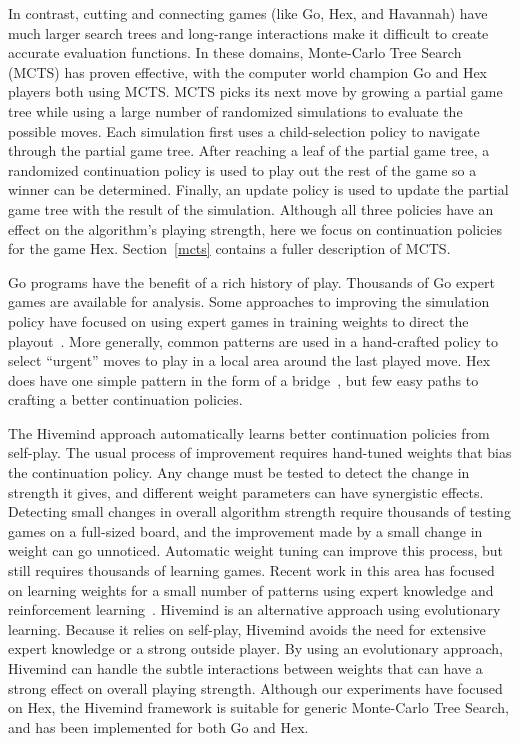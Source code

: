 \documentclass{acm_proc_article-sp}
\begin{document}
In contrast, cutting and connecting games (like Go, Hex, and Havannah)
have much larger search trees and long-range interactions make it difficult to create accurate evaluation functions.
In these domains, Monte-Carlo Tree Search (MCTS) has proven effective, 
with the computer world champion Go and Hex players both using MCTS.
MCTS picks its next move by growing a partial game tree while using
a large number of randomized simulations to evaluate the possible moves.
Each simulation first uses a child-selection policy to navigate through the partial game tree.
After reaching a leaf of the partial game tree, a randomized continuation policy is used to play out the rest of the game 
so a winner can be determined.
Finally, an update policy is used to update the partial game tree with the result of the simulation.
Although all three policies have an effect on the algorithm's playing strength, here we focus on
continuation policies for the game Hex.
Section~\ref{mcts} contains a fuller description of MCTS.

Go programs have the benefit of a rich history of play. Thousands of Go expert games are available for analysis. Some approaches to improving the simulation policy have focused on using expert games in training weights to direct the playout~\cite{chaslot2010adding}. More generally, common patterns are used in a hand-crafted policy to select ``urgent'' moves to play in a local area around the last played move. Hex does have one simple pattern in the form of a bridge~\cite{anshelevich2002hierarchical}, but few easy paths to crafting a better continuation policies.

The Hivemind approach automatically learns better continuation policies from self-play. 
The usual process of improvement requires hand-tuned weights that bias the continuation policy. 
Any change must be tested to detect the change in strength it gives,
and different weight parameters can have synergistic effects.
Detecting small changes in overall algorithm strength require thousands of testing games on a full-sized board, and
the improvement made by a small change in weight can go unnoticed.
Automatic weight tuning can improve this process, but still requires thousands of learning games. 
Recent work in this area has focused on learning weights for a small number of patterns using expert knowledge and reinforcement learning~\cite{silver2009monte}. 
Hivemind is an alternative approach using evolutionary learning.
Because it relies on self-play, Hivemind avoids the need for extensive expert knowledge or a strong outside player.
By using an evolutionary approach, Hivemind can handle the subtle interactions between weights that can have a strong effect on overall playing strength.
Although our experiments have focused on Hex, 
the Hivemind framework is suitable for generic Monte-Carlo Tree Search, and has been implemented for
both Go and Hex.
\end{document}
